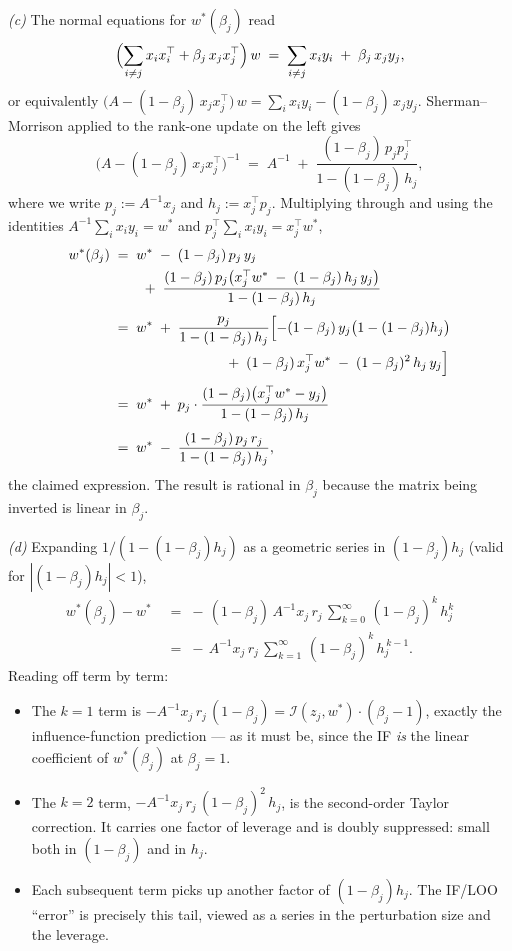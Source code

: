 \documentclass[11pt]{article}
\begin{document}
\begin{solution}[ex:ols-if]
\textit{(c)} The normal equations for $w^*(\beta_j)$ read
\[
  \Bigl(\sum_{i\ne j} x_i x_i^\top + \beta_j\,x_j x_j^\top\Bigr)\,w \;=\; \sum_{i\ne j} x_i y_i \;+\; \beta_j\,x_j y_j,
\]
or equivalently $\bigl(A - (1-\beta_j)\,x_j x_j^\top\bigr)\,w = \sum_i x_i y_i - (1-\beta_j)\,x_j y_j$. Sherman--Morrison applied to the rank-one update on the left gives
\[
  \bigl(A - (1-\beta_j)\,x_j x_j^\top\bigr)^{-1} \;=\; A^{-1} \;+\; \frac{(1-\beta_j)\,p_j p_j^\top}{1 - (1-\beta_j)\,h_j},
\]
where we write $p_j := A^{-1} x_j$ and $h_j := x_j^\top p_j$. Multiplying through and using the identities $A^{-1}\sum_i x_i y_i = w^*$ and $p_j^\top\sum_i x_i y_i = x_j^\top w^*$,
\begin{align*}
  w^*(\beta_j)
  &\;=\; w^* \;-\; (1-\beta_j)\,p_j\,y_j \\
  &\qquad\;+\; \frac{(1-\beta_j)\,p_j\bigl(x_j^\top w^* \;-\; (1-\beta_j)\,h_j\,y_j\bigr)}{1 - (1-\beta_j)\,h_j} \\[3pt]
  &\;=\; w^* \;+\; \frac{p_j}{1 - (1-\beta_j)\,h_j}\Bigl[-(1-\beta_j)\,y_j\bigl(1-(1-\beta_j)h_j\bigr) \\
  &\qquad\qquad\qquad\qquad\;+\; (1-\beta_j)\,x_j^\top w^* \;-\; (1-\beta_j)^2\,h_j\,y_j\Bigr] \\[3pt]
  &\;=\; w^* \;+\; p_j\cdot\frac{(1-\beta_j)\bigl(x_j^\top w^* - y_j\bigr)}{1 - (1-\beta_j)\,h_j} \\[3pt]
  &\;=\; w^* \;-\; \frac{(1-\beta_j)\,p_j\,r_j}{1 - (1-\beta_j)\,h_j},
\end{align*}
the claimed expression. The result is rational in $\beta_j$ because the matrix being inverted is linear in $\beta_j$.

\textit{(d)} Expanding $1/(1-(1-\beta_j) h_j)$ as a geometric series in $(1-\beta_j) h_j$ (valid for $|(1-\beta_j) h_j| < 1$),
\begin{align*}
  w^*(\beta_j) - w^* &\;=\; -\,(1-\beta_j)\,A^{-1} x_j\,r_j\,\sum_{k=0}^{\infty}\,(1-\beta_j)^{k}\,h_j^{k} \\
  &\;=\; -\,A^{-1} x_j\,r_j\,\sum_{k=1}^{\infty}\,(1-\beta_j)^{k}\,h_j^{\,k-1}.
\end{align*}
Reading off term by term:
\begin{itemize}
  \item The $k=1$ term is $-A^{-1} x_j\,r_j\,(1-\beta_j) = \mathcal{I}(z_j,w^*)\cdot(\beta_j - 1)$, exactly the influence-function prediction --- as it must be, since the IF \emph{is} the linear coefficient of $w^*(\beta_j)$ at $\beta_j = 1$.
  \item The $k=2$ term, $-A^{-1} x_j\,r_j\,(1-\beta_j)^2\,h_j$, is the second-order Taylor correction. It carries one factor of leverage and is doubly suppressed: small both in $(1-\beta_j)$ and in $h_j$.
  \item Each subsequent term picks up another factor of $(1-\beta_j) h_j$. The IF/LOO ``error'' is precisely this tail, viewed as a series in the perturbation size and the leverage.
\end{itemize}


\end{solution}
\end{document}
